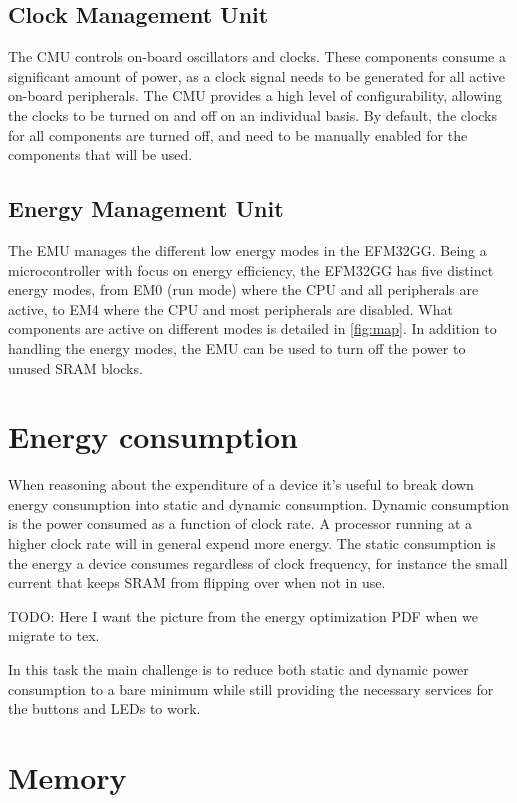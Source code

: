 \subsection{Clock Management Unit}
The CMU controls on-board oscillators and clocks. These components consume a significant amount of power, as a clock signal needs to be generated for all active on-board peripherals. The CMU provides a high level of configurability, allowing the clocks to be turned on and off on an individual basis. By default, the clocks for all components are turned off, and need to be manually enabled for the components that will be used.\cite{EFM32GG-RM}

\subsection{Energy Management Unit}
The EMU manages the different low energy modes in the EFM32GG. Being a microcontroller with focus on energy efficiency, the EFM32GG has five distinct energy modes, from EM0 (run mode) where the CPU and all peripherals are active, to EM4 where the CPU and most peripherals are disabled. What components are active on different modes is detailed in \ref{fig:map}. In addition to handling the energy modes, the EMU can be used to turn off the power to unused SRAM blocks.\cite{EFM32GG-RM}


\section{Energy consumption}

When reasoning about the expenditure of a device it’s useful to break down energy consumption into static and dynamic consumption. Dynamic consumption is the power consumed as a function of clock rate. A processor running at a higher clock rate will in general expend more energy. The static consumption is the energy a device consumes regardless of clock frequency, for instance the small current that keeps SRAM from flipping over when not in use.

TODO: Here I want the picture from the energy optimization PDF when we migrate to tex.

In this task the main challenge is to reduce both static and dynamic power consumption to a bare minimum while still providing the necessary services for the buttons and LEDs to work.



\section{Memory}

